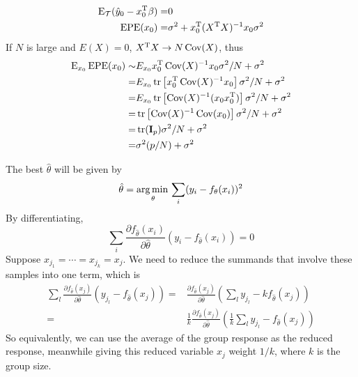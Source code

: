 \begin{sol}
\begin{align*}
\operatorname{E}_\mathcal{T} (\hat{y}_0-x_0^{\mathrm{T}}\beta) =& 0 \\
\mathrm{EPE}(x_0) =& \sigma^2 + x_0^{\mathrm{T}}(X^{\mathrm{T}}X)^{-1}x_0\sigma^2
\end{align*}
If $N$ is large and $E(X)=0$, $X^{\mathrm{T}}X\to N\operatorname{Cov}(X)$, thus
\begin{align*}
\operatorname{E}_{x_0}\mathrm{EPE}(x_0) \sim & E_{x_0} x_0^{\mathrm{T}}\operatorname{Cov}(X)^{-1}x_0\sigma^2/N + \sigma^2 \\
=& E_{x_0} \operatorname{tr} \left[x_0^{\mathrm{T}}\operatorname{Cov}(X)^{-1}x_0\right]\sigma^2/N + \sigma^2 \\
=& E_{x_0} \operatorname{tr} \left[\operatorname{Cov}(X)^{-1}(x_0x_0^{\mathrm{T}})\right]\sigma^2/N + \sigma^2 \\
=& \operatorname{tr}\left[ \operatorname{Cov}(X)^{-1} \operatorname{Cov}(x_0)\right]\sigma^2/N + \sigma^2 \\
=& \operatorname{tr}(\mathbf{I}_p)\sigma^2/N + \sigma^2 \\
=& \sigma^2(p/N) + \sigma^2
\end{align*}
\end{sol}

\begin{sol}
The best $\hat{\theta}$ will be given by 
\[
\hat{\theta}=\operatorname*{arg\,min\,}_\theta \sum_i (y_i-f_\theta(x_i))^2
\]
By differentiating,
\[
\sum_i \frac{\partial f_{\hat{\theta}}(x_i)}{\partial \hat{\theta}} (y_i-f_{\hat{\theta}}(x_i)) =0
\]
Suppose $x_{j_1}=\cdots=x_{j_k}=x_j$. We need to reduce the summands that involve these samples into one term, which is
\begin{align*}
\sum_l \frac{\partial f_{\hat{\theta}}(x_j)}{\partial \hat{\theta}} (y_{j_l}-f_{\hat{\theta}}(x_j)) =& \frac{\partial f_{\hat{\theta}}(x_j)}{\partial \hat{\theta}}\left(\sum_l y_{j_l} - k f_{\hat{\theta}}(x_j)\right) \\
=& \frac{1}{k} \frac{\partial f_{\hat{\theta}}(x_j)}{\partial \hat{\theta}}\left(\frac{1}{k}\sum_l y_{j_l}-f_{\hat{\theta}}(x_j)\right)
\end{align*}
So equivalently, we can use the average of the group response as the reduced response, meanwhile giving this reduced variable $x_j$ weight $1/k$, where $k$ is the group size.
\end{sol}

